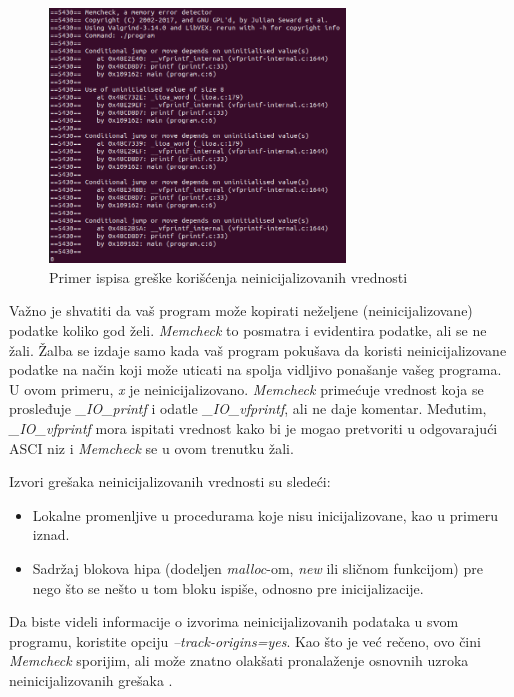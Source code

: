 \documentclass[12pt,oneside]{memoir}
\theoremstyle{plain}
\theoremstyle{definition}
\begin{document}
\begin{figure}[!ht]
  \centering
  \includegraphics[width=0.7\textwidth]{uninitialisedError.png}
  \caption{Primer ispisa greške korišćenja neinicijalizovanih vrednosti}
  \label{fig:slika2.5}
\end{figure}

Važno je shvatiti da vaš program može kopirati neželjene (neinicijalizovane) podatke koliko god želi. \textit{Memcheck} to posmatra i evidentira podatke, ali se ne žali. Žalba se izdaje samo kada vaš program pokušava da koristi neinicijalizovane podatke na način koji može uticati na spolja vidljivo ponašanje vašeg programa. U ovom primeru, \textit{x} je neinicijalizovano. \textit{Memcheck} primećuje vrednost koja se prosleđuje \textit{\_IO\_printf} i odatle \textit{\_IO\_vfprintf}, ali ne daje komentar. Međutim, \textit{\_IO\_vfprintf} mora ispitati vrednost  kako bi je mogao pretvoriti u odgovarajući ASCI niz i \textit{Memcheck} se u ovom trenutku žali.

Izvori grešaka neinicijalizovanih vrednosti su sledeći:
\begin{itemize}
\item Lokalne promenljive u procedurama koje nisu inicijalizovane, kao u primeru iznad.
\item Sadržaj blokova hipa (dodeljen \textit{malloc}-om, \textit{new} ili sličnom funkcijom) pre nego što se nešto u tom bloku ispiše, odnosno pre inicijalizacije.
\end{itemize}

Da biste videli informacije o izvorima neinicijalizovanih podataka u svom programu, koristite opciju \textit{--track-origins=yes}. Kao što je već rečeno, ovo čini \textit{Memcheck} sporijim, ali može znatno olakšati pronalaženje osnovnih uzroka neinicijalizovanih grešaka \cite{Memcheck}. 
\end{document}
